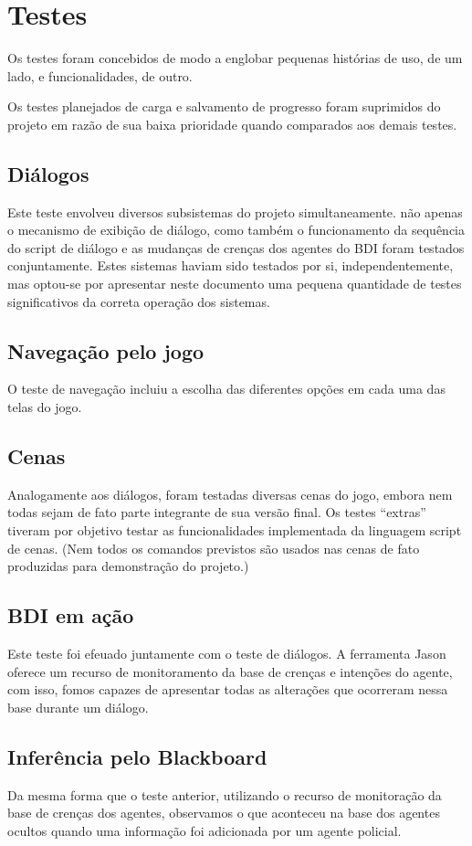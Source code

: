 \chapter{Testes}


Os testes foram concebidos de modo a englobar pequenas histórias de
uso, de um lado, e funcionalidades, de outro.

Os testes planejados de carga e salvamento de progresso foram suprimidos do projeto em razão de sua baixa prioridade quando comparados aos demais testes.

\section{Diálogos}

Este teste envolveu diversos subsistemas do projeto simultaneamente. não apenas o mecanismo de exibição de diálogo, como também o funcionamento da sequência do script de diálogo e as mudanças de crenças dos agentes do BDI foram testados conjuntamente. Estes sistemas haviam sido testados por si, independentemente, mas optou-se por apresentar neste documento uma pequena quantidade de testes significativos da correta operação dos sistemas.

\section{Navegação pelo jogo}

O teste de navegação incluiu a escolha das diferentes opções em cada uma das telas do jogo.

\section{Cenas}

Analogamente aos diálogos, foram testadas diversas cenas do jogo, embora nem todas sejam de fato parte integrante de sua versão final. Os testes ``extras'' tiveram por objetivo testar as funcionalidades implementada da linguagem script de cenas. (Nem todos os comandos previstos são usados nas cenas de fato produzidas para demonstração do projeto.)

\section{BDI em ação}
Este teste foi efeuado juntamente com o teste de diálogos. A ferramenta Jason oferece um recurso de monitoramento da base de crenças e intenções do agente, com isso, fomos capazes de apresentar todas as alterações que ocorreram nessa base durante um diálogo.

\section{Inferência pelo Blackboard}
Da mesma forma que o teste anterior, utilizando o recurso de monitoração da base de crenças dos agentes, observamos o que aconteceu na base dos agentes ocultos quando uma informação foi adicionada por um agente policial.
